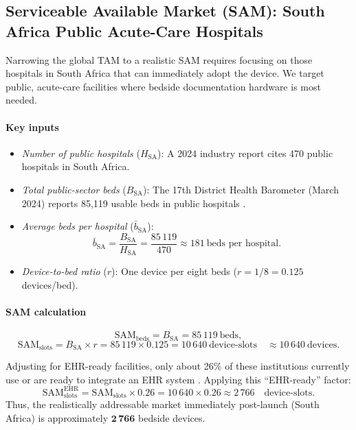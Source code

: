 \documentclass[a4paper,11pt]{article}
\begin{document}
\subsection{Serviceable Available Market (SAM): South Africa Public Acute-Care Hospitals}

Narrowing the global TAM to a realistic SAM requires focusing on those hospitals in South Africa that can immediately adopt the device.  We target public, acute-care facilities where bedside documentation hardware is most needed.

\paragraph{Key inputs}  
\begin{itemize}
  \item \emph{Number of public hospitals} (\(H_{\mathrm{SA}}\)):  
    A 2024 industry report cites 470 public hospitals in South Africa. \cite{BridgingGapSouth}
    
  \item \emph{Total public-sector beds} (\(B_{\mathrm{SA}}\)):  
    The 17th District Health Barometer (March 2024) reports 85,119 usable beds in public hospitals \cite{PDFDistrictHealth2025}.  
    
  \item \emph{Average beds per hospital} (\(\bar b_{\mathrm{SA}}\)):  
    \[
      \bar b_{\mathrm{SA}}
      = \frac{B_{\mathrm{SA}}}{H_{\mathrm{SA}}}
      = \frac{85\,119}{470}
      \approx 181\ \text{beds per hospital}.
    \]
  \item \emph{Device-to-bed ratio} (\(r\)):  
    One device per eight beds (\(r=1/8=0.125\) devices/bed).
\end{itemize}

\paragraph{SAM calculation}  
\[
  \mathrm{SAM}_{\mathrm{beds}}
  = B_{\mathrm{SA}}
  = 85\,119\ \text{beds},
\]
\[
  \mathrm{SAM}_{\mathrm{slots}}
  = B_{\mathrm{SA}} \times r
  = 85\,119 \times 0.125
  = 10\,640\ \text{device-slots}
  \quad\approx10\,640\ \text{devices}.
\]

 Adjusting for EHR-ready facilities, only about 26\% of these institutions currently use or are ready to integrate an EHR system \cite{ProgressImplementingUsing2023}. Applying this “EHR-ready” factor:
\[
  \mathrm{SAM}_{\mathrm{slots}}^{\mathrm{EHR}}
  = \mathrm{SAM}_{\mathrm{slots}} \times 0.26
  = 10\,640 \times 0.26
  \approx 2\,766
  \quad\text{device-slots.}
\]
Thus, the realistically addressable market immediately post-launch  (South Africa) is approximately \(\mathbf{2\,766}\) bedside devices.
\end{document}
